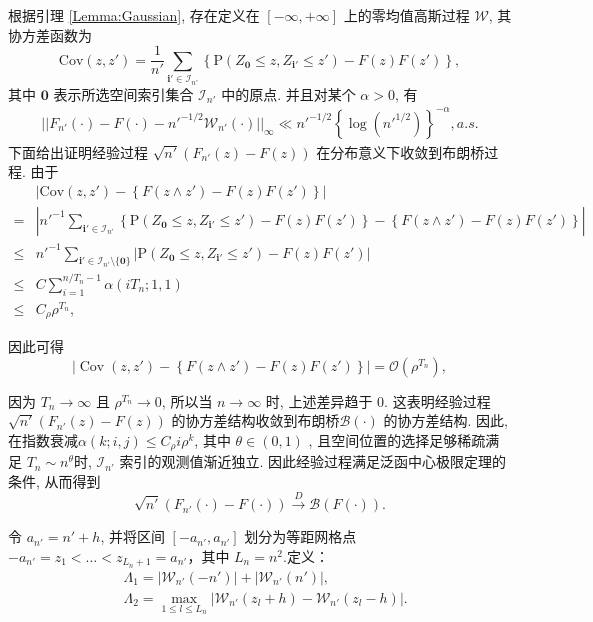\documentclass[a4paper,openay,14pt]{ctexbook}
\numberwithin{equation}{section}
\numberwithin{lem}{section}
\begin{document}
    根据引理 \ref{Lemma:Gaussian}, 存在定义在 $[-\infty,+\infty]$ 上的零均值高斯过程 $\mathcal{W}$, 其协方差函数为
$$\text{Cov} (z,z')=\frac{1}{n'}\sum_{\mathbf{i}'\in \mathcal{I}_{n'}}\left\{\mathrm{P}\left(Z_{\mathbf{0}}\le z, Z_{\mathbf{i}'}\le z'\right)-F(z)F(z')\right\},$$ 
其中 $\mathbf{0}$ 表示所选空间索引集合 $\mathcal{I}_{n'}$ 中的原点. 并且对某个 $\alpha>0$, 有
\begin{align}
||F_{n'}(\cdot)-F(\cdot)-n'^{-1/2}\mathcal{W}_{n'}(\cdot)||_{\infty}\ll n'^{-1/2}\left\{\log (n'^{1/2})\right\}^{-\alpha},  a.s.  
\label{EQ:gaussianprocess}
\end{align}
下面给出证明经验过程 $\sqrt{n'}(F_{n'}(z) - F(z))$ 在分布意义下收敛到布朗桥过程. 由于  
\begin{align*}
    &\left| \text{Cov}(z, z') - \left\{F(z \wedge z') - F(z)F(z')\right\} \right| \\
    = &\left| n'^{-1} \sum_{\mathbf{i}' \in \mathcal{I}_{n'}} \left\{\mathrm{P}(Z_{\mathbf{0}} \le z, Z_{\mathbf{i}'} \le z') - F(z)F(z')\right\} - \left\{F(z \wedge z') - F(z)F(z')\right\} \right| \\
    \le &n'^{-1} \sum_{\mathbf{i}' \in \mathcal{I}_{n'} \setminus \{\mathbf{0}\}} \left| \mathrm{P}(Z_{\mathbf{0}} \le z, Z_{\mathbf{i}'} \le z') - F(z)F(z') \right| \\
    \le &C \sum_{i=1}^{n/T_n - 1} \alpha(iT_n; 1, 1) \\
    \le &C_{\rho} \rho^{T_n},
\end{align*}

因此可得
\begin{equation}\label{EQU:cov}
    \left| \operatorname{Cov}(z, z') - \left\{ F(z \wedge z') - F(z)F(z') \right\} \right| = \mathcal{O}(\rho^{T_n}),
\end{equation}

因为 $ T_n \to \infty $ 且 $ \rho^{T_n} \to 0 $, 所以当 $ n \to \infty $ 时, 上述差异趋于 0. 这表明经验过程 $\sqrt{n'}(F_{n'}(z) - F(z))$ 的协方差结构收敛到布朗桥$\mathcal{B}(\cdot)$ 的协方差结构. 因此, 在指数衰减$\alpha(k; i, j) \leq C_\rho i \rho^k$, 其中 $\theta \in (0,1)$ , 且空间位置的选择足够稀疏满足 $T_n \sim n^{\theta}$时, $\mathcal{I}_{n'}$ 索引的观测值渐近独立. 因此经验过程满足泛函中心极限定理的条件, 从而得到
\[
\sqrt{n'}(F_{n'}(\cdot) - F(\cdot)) \overset{D}{\longrightarrow} \mathcal{B}(F(\cdot)).
\]



令 $a_{n'} = n'+h$, 并将区间 $[-a_{n'}, a_{n'}] $ 划分为等距网格点 $-a_{n'} = z_1 < \dots < z_{L_n+1} = a_{n'}$，其中 $L_n = n^2$.定义：
\begin{align}\label{EQ:Lamda1}
    &\Lambda_1 = \left\vert \mathcal{W}_{n'}(-n')\right\vert+ \left\vert \mathcal{W}_{n'}(n')\right\vert, \\ 
    &\Lambda_2 = \max_{1\leq l\leq L_n}\left\vert \mathcal{W}_{n'}(z_l + h) - \mathcal{W}_{n'}(z_l-h)\right\vert. \label{EQ:Lamda2}
\end{align}
\end{document}

